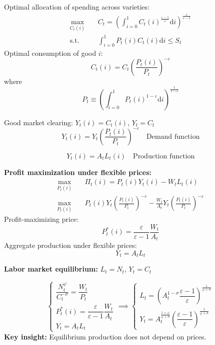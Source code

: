 \documentclass{article}
\begin{document}

Optimal allocation of spending across varieties:
\begin{align*}
    \max_{C_t(i)} & \quad C_t=\left(\int_{i=0}^1 C_t(i)^{\frac{\varepsilon-1}{\varepsilon}} \textrm{d}i \right)^{\frac{\varepsilon}{\varepsilon-1}} \\
    \textrm{s.t.} & \quad 
    \int_{i=0}^{1}P_t(i)C_t(i)\textrm{d}i\leq S_t
\end{align*}
Optimal consumption of good $i$:
\begin{equation*}
    C_t(i)=C_t\left(\frac{P_t(i)}{P_t} \right)^{-\varepsilon}
\end{equation*}
where
\begin{equation*}
    P_t\equiv\left(\int_{i=0}^{1}P_t(i)^{1-\varepsilon}\textrm{d}i \right)^{\frac{1}{1-\varepsilon}}
\end{equation*}

Good market clearing: $Y_t(i)=C_t(i)$, $Y_t=C_t$
\begin{equation*}
    Y_t(i)=Y_t\left(\frac{P_t(i)}{P_t} \right)^{-\varepsilon}
    \quad \textrm{Demand function}
\end{equation*}

\begin{equation*}
    Y_t(i)=A_tL_t(i)
    \quad \textrm{Production function}
\end{equation*}

\textbf{Profit maximization under flexible prices:}
\begin{align*}
    \max_{P_t(i)} & \quad \Pi_t(i)=P_t(i)Y_t(i) - W_t L_t(i) \\
     \max_{P_t(i)} & \quad P_t(i)Y_t\left(\frac{P_t(i)}{P_t} \right)^{-\varepsilon} -
     \frac{W_t}{A_t}Y_t\left(\frac{P_t(i)}{P_t} \right)^{-\varepsilon}
\end{align*}
Profit-maximizing price:
\begin{equation*}
    P_t^*(i)=\frac{\varepsilon}{\varepsilon-1}\frac{W_t}{A_t}
\end{equation*}
Aggregate production under flexible prices:
\begin{equation*}
    Y_t=A_tL_t
\end{equation*}

\textbf{Labor market equilibrium:} $L_t=N_t$, $Y_t=C_t$

\begin{equation*}
    \begin{cases}
        \dfrac{N_t^{\varphi}}{C_t^{-\sigma}}=\dfrac{W_t}{P_t} \\
        P_t^*(i)=\dfrac{\varepsilon}{\varepsilon-1}\dfrac{W_t}{A_t} \\
        Y_t=A_tL_t
    \end{cases}\implies
    \begin{cases}
        L_t=\left(A_t^{1-\sigma}\dfrac{\varepsilon-1}{\varepsilon} \right)^{\frac{1}{\varphi+\sigma}} \\
        Y_t=A_t^{\frac{1+\varphi}{\varphi+\sigma}}\left(\dfrac{\varepsilon-1}{\varepsilon} \right)^{\frac{1}{\varphi+\sigma}}
    \end{cases}
\end{equation*}
\textbf{Key insight:} Equilibrium production does not depend on prices.
\end{document}
